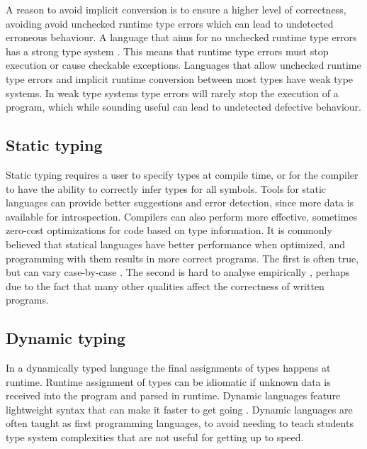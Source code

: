 A reason to avoid implicit conversion is to ensure a higher level of correctness, avoiding avoid unchecked runtime type errors which can lead to undetected erroneous behaviour. A language that aims for no unchecked runtime type errors has a strong type system \cite{cardelli_typeful_1989}. This means that runtime type errors must stop execution or cause checkable exceptions. Languages that allow unchecked runtime type errors and implicit runtime conversion between most types have weak type systems. In weak type systems type errors will rarely stop the execution of a program, which while sounding useful can lead to undetected defective behaviour.

\subsection{Static typing}
Static typing requires a user to specify types at compile time, or for the compiler to have the ability to correctly infer types for all symbols. Tools for static languages can provide better suggestions and error detection, since more data is available for introspection. Compilers can also perform more effective, sometimes zero-cost optimizations for code based on type information. It is commonly believed that statical languages have better performance when optimized, and programming with them results in more correct programs. The first is often true, but can vary case-by-case \cite{nanz_comparative_2015}. The second is hard to analyse empirically \cite{codequality_reproudction_2019}, perhaps due to the fact that many other qualities affect the correctness of written programs. 

\subsection{Dynamic typing}
In a dynamically typed language the final assignments of types happens at runtime. Runtime assignment of types can be idiomatic if unknown data is received into the program and parsed in runtime. Dynamic languages feature lightweight syntax that can make it faster to get going \cite{di_grazia_evolution_2022}. Dynamic languages are often taught as first programming languages, to avoid needing to teach students type system complexities that are not useful for getting up to speed.


